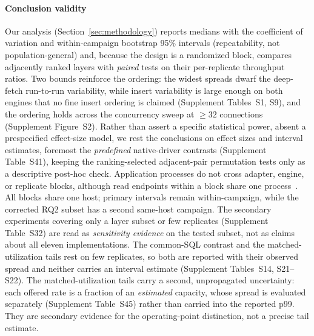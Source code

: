 \paragraph{Conclusion validity}
Our analysis (Section~\ref{sec:methodology}) reports medians with the coefficient of variation and
within-campaign bootstrap 95\% intervals (repeatability, not population-general) and, because the
design is a randomized block, compares adjacently ranked layers with \emph{paired} tests on their
per-replicate throughput ratios.
Two bounds reinforce the ordering: the widest spreads dwarf the deep-fetch run-to-run variability,
while insert variability is large enough on both engines that no fine insert ordering is claimed
(Supplement Tables~S1, S9), and the ordering holds across the concurrency sweep at $\geq32$
connections (Supplement Figure~S2).
Rather than assert a specific statistical power, absent a prespecified effect-size model, we rest the
conclusions on effect sizes and interval estimates, foremost the \emph{predefined} native-driver
contrasts (Supplement Table~S41), keeping the ranking-selected adjacent-pair permutation tests only
as a descriptive post-hoc check.
Application processes do not cross adapter, engine, or replicate blocks, although read endpoints
within a block share one process~\cite{kalibera2013rigorous}.
All blocks share one host; primary intervals remain within-campaign, while the corrected RQ2 subset
has a second same-host campaign.
The secondary experiments covering only a layer subset or few replicates (Supplement Table~S32) are
read as \emph{sensitivity evidence} on the tested subset, not as claims about all eleven
implementations.
The common-SQL contrast and the matched-utilization tails rest on few replicates, so both are
reported with their observed spread and neither carries an interval estimate (Supplement
Tables~S14, S21--S22).
The matched-utilization tails carry a second, unpropagated uncertainty: each offered rate is a
fraction of an \emph{estimated} capacity, whose spread is evaluated separately (Supplement
Table~S45) rather than carried into the reported p99.
They are secondary evidence for the operating-point distinction, not a precise tail estimate.
